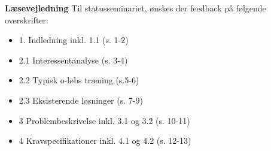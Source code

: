 {\Huge\textbf{Læsevejledning}}\newline
\newline
Til statusseminariet, ønskes der feedback på følgende overskrifter:
\begin{itemize}
\item 1. Indledning inkl. 1.1 (s. 1-2)
\item 2.1 Interessentanalyse (s. 3-4)
\item 2.2 Typisk o-løbs træning (s.5-6)
\item 2.3 Eksisterende løsninger (s. 7-9)
\item 3 Problembeskrivelse inkl. 3.1 og 3.2 (s. 10-11)
\item 4 Kravspecifikationer inkl. 4.1 og 4.2 (s. 12-13)
\end{itemize}